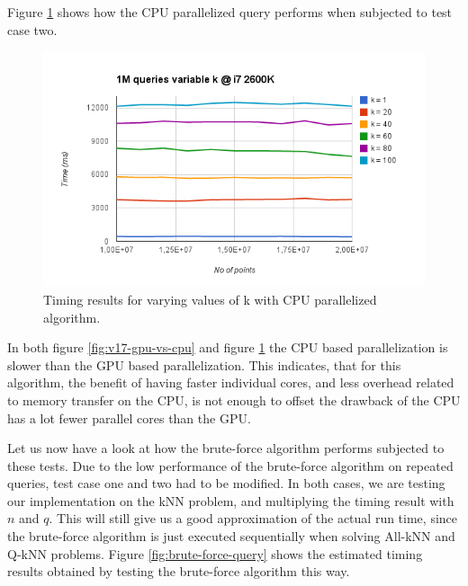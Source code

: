 Figure \ref{fig:v17-cpu-variable-k} shows how the CPU parallelized query performs when subjected to test case two.

\begin{figure}[ht!]
    \centering
    \includegraphics[width=120mm]{../gfx/v17-cpu-variable-k.png}
    \caption{Timing results for varying values of k with CPU parallelized algorithm.}
    \label{fig:v17-cpu-variable-k}
\end{figure}

In both figure \ref{fig:v17-gpu-vs-cpu} and figure \ref{fig:v17-cpu-variable-k} the CPU based parallelization is slower than the GPU based parallelization. This indicates, that for this algorithm, the benefit of having faster individual cores, and less overhead related to memory transfer on the CPU, is not enough to offset the drawback of the CPU has a lot fewer parallel cores than the GPU.

Let us now have a look at how the brute-force algorithm performs subjected to these tests. Due to the low performance of the brute-force algorithm on repeated queries, test case one and two had to be modified. In both cases, we are testing our implementation on the kNN problem, and multiplying the timing result with $n$ and $q$. This will still give us a good approximation of the actual run time, since the brute-force algorithm is just executed sequentially when solving All-kNN and Q-kNN problems. Figure \ref{fig:brute-force-query} shows the estimated timing results obtained by testing the brute-force algorithm this way.


